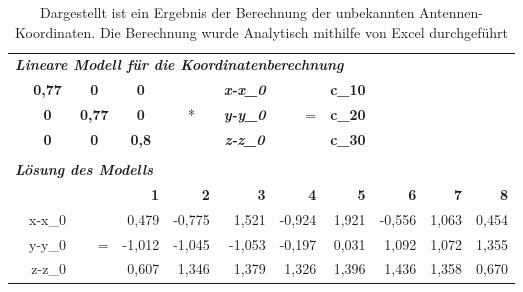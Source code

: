 \begin{table}[ht]
  \caption{Dargestellt ist ein Ergebnis der Berechnung der unbekannten Antennen-Koordinaten. Die Berechnung wurde Analytisch mithilfe von Excel durchgeführt}
  \vspace{0.5cm}
    \begin{tabular}{r|rrr|r|r|r|r|rrr}
    \multicolumn{11}{l}{\textit{\textbf{Lineare Modell für die Koordinatenberechnung}}} \\
          & \multicolumn{1}{c}{\textbf{0,77}} & \multicolumn{1}{c}{\textbf{0}} & \multicolumn{1}{c|}{\textbf{0}} &       & \multicolumn{1}{c|}{\textit{\textbf{x-x\_0}}} &       & \multicolumn{1}{c|}{\textbf{c\_10}} &       &       &  \\
          & \multicolumn{1}{c}{\textbf{0}} & \multicolumn{1}{c}{\textbf{0,77}} & \multicolumn{1}{c|}{\textbf{0}} & \multicolumn{1}{c|}{*} & \multicolumn{1}{c|}{\textit{\textbf{y-y\_0}}} & =     & \multicolumn{1}{c|}{\textbf{c\_20}} &       &       &  \\
          & \multicolumn{1}{c}{\textbf{0}} & \multicolumn{1}{c}{\textbf{0}} & \multicolumn{1}{c|}{\textbf{0,8}} &       & \multicolumn{1}{c|}{\textit{\textbf{z-z\_0}}} &       & \multicolumn{1}{c|}{\textbf{c\_30}} &       &       &  \\
    \multicolumn{1}{r}{} &       &       & \multicolumn{1}{r}{} & \multicolumn{1}{r}{} & \multicolumn{1}{r}{} & \multicolumn{1}{r}{} & \multicolumn{1}{r}{} &       &       &  \\
    \multicolumn{11}{l}{\textit{\textbf{Lösung des Modells}}} \\
    \multicolumn{1}{r}{} &       &       & \multicolumn{1}{r}{\textbf{1}} & \multicolumn{1}{r}{\textbf{2}} & \multicolumn{1}{r}{\textbf{3}} & \multicolumn{1}{r}{\textbf{4}} & \multicolumn{1}{r}{\textbf{5}} & \textbf{6} & \textbf{7} & \textbf{8}\\
\cline{2-11}    \multicolumn{1}{r}{} & x-x\_0 &       & \multicolumn{1}{r}{0,479} & \multicolumn{1}{r}{-0,775} & \multicolumn{1}{r}{1,521} & \multicolumn{1}{r}{-0,924} & \multicolumn{1}{r}{1,921} & -0,556 & 1,063 & 0,454 \\
    \multicolumn{1}{r}{} & y-y\_0 & =     & \multicolumn{1}{r}{-1,012} & \multicolumn{1}{r}{-1,045} & \multicolumn{1}{r}{-1,053} & \multicolumn{1}{r}{-0,197} & \multicolumn{1}{r}{0,031} & 1,092 & 1,072 & 1,355 \\
    \multicolumn{1}{r}{} & z-z\_0 &       & \multicolumn{1}{r}{0,607} & \multicolumn{1}{r}{1,346} & \multicolumn{1}{r}{1,379} & \multicolumn{1}{r}{1,326} & \multicolumn{1}{r}{1,396} & 1,436 & 1,358 & 0,670 \\

\end{tabular}
\end{table}
